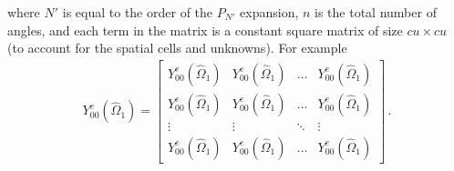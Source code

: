\documentclass[10pt]{article}
\begin{document}
where $N'$ is equal to the order of the $P_{N'}$ expansion, $n$ is the total number of angles, and each term in the matrix is a constant square matrix of size $cu \times cu$ (to account for the spatial cells and unknowns). For example
%
\begin{align*}
Y_{00}^e(\hat{\Omega}_1)  = 
\begin{bmatrix}
   Y_{00}^e(\hat{\Omega}_1) & Y_{00}^e(\hat{\Omega}_1)  & \dots & Y_{00}^e(\hat{\Omega}_1) \\
   Y_{00}^e(\hat{\Omega}_1) & Y_{00}^e(\hat{\Omega}_1)  & \dots & Y_{00}^e(\hat{\Omega}_1) \\
   \vdots & \vdots & \ddots & \vdots \\
   Y_{00}^e(\hat{\Omega}_1) & Y_{00}^e(\hat{\Omega}_1)  & \dots & Y_{00}^e(\hat{\Omega}_1)
\end{bmatrix}\,.
\end{align*}
\end{document}
